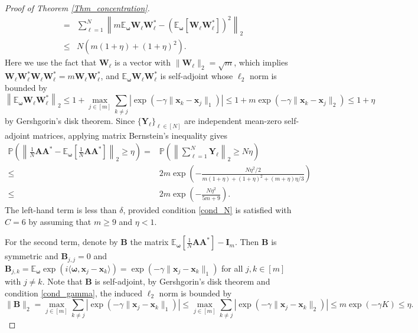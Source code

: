 \documentclass[11pt,twoside]{article}
\theoremstyle{plain}
\theoremstyle{definition}
\theoremstyle{remark}
\newcommand{\E}{\mathbb{E}}
\newcommand{\Pbb}{\mathbb{P}}
\newcommand{\Ab}{\mathbf{A}}
\newcommand{\Bb}{\mathbf{B}}
\newcommand{\Ib}{\mathbf{I}}
\newcommand{\Yb}{\mathbf{Y}}
\newcommand{\Wb}{\mathbf{W}}
\newcommand{\xb}{\mathbf{x}}
\newcommand{\omegab}{\boldsymbol\omega}
\begin{document}
\begin{proof}[Proof of Theorem \ref{Thm_concentration}]
\begin{equation}
\begin{aligned}
=& \sum_{\ell=1}^N \left\| m\E_{\omegab} \Wb_\ell \Wb_\ell^* - \left( \E_{\omegab} \left[\Wb_\ell \Wb_\ell^*\right]\right)^2 \right\|_2 \\
\leq& N\left(m(1+\eta)+(1+\eta)^2\right).
\end{aligned}
\end{equation}
Here we use the fact that $\Wb_\ell$ is a vector with $\|\Wb_\ell\|_2 = \sqrt{m}$, which implies $\Wb_\ell \Wb_\ell^* \Wb_\ell \Wb_\ell^* = m \Wb_\ell \Wb_\ell^*$, and $\E_{\omegab} \Wb_\ell \Wb_\ell^*$ is self-adjoint whose $\ell_2$ norm is bounded by
\begin{equation}
\left\| \E_{\omegab} \Wb_\ell \Wb_\ell^* \right\|_2 \leq 1 + \max_{j\in[m]} \sum_{k\neq j} |\exp(-\gamma \|\xb_k-\xb_j\|_1)| \leq 1 + m\exp(-\gamma \|\xb_k-\xb_j\|_2 ) \leq 1+\eta
\end{equation}
by Gershgorin’s disk theorem. Since $\{\Yb_\ell\}_{\ell\in[N]}$ are independent mean-zero self-adjoint matrices, applying matrix Bernstein's inequality gives 
\begin{equation}
\begin{aligned}
\Pbb \left( \left\| \frac{1}{N}\Ab\Ab^* - \E_{\omegab} \left[\frac{1}{N}\Ab\Ab^*\right] \right\|_2 \geq \eta  \right) =& \Pbb \left( \left\|\sum_{\ell=1}^N \Yb_\ell \right\|_2 \geq N\eta \right)\\ 
\leq & 2m\exp\left( - \frac{N\eta^2/2}{m(1+\eta)+(1+\eta)^2 + (m+\eta)\eta/3} \right) \\
\leq& 2m\exp\left( - \frac{N\eta^2}{5m+9} \right).
\end{aligned}
\end{equation}
The left-hand term is less than $\delta$, provided condition \eqref{cond_N} is satisfied with $C=6$ by assuming that $m\geq 9$ and $\eta<1$.

For the second term, denote by $\Bb$ the matrix $\E_{\omegab} [\frac{1}{N}\Ab\Ab^*] - \Ib_m$. Then $\Bb$ is symmetric and $\Bb_{j,j}=0$ and $\Bb_{j,k} = \E_{\omegab} \exp(i\langle \omegab, \xb_j-\xb_k\rangle) = \exp(-\gamma\|\xb_j-\xb_k\|_1)$ for all $j,k\in[m]$ with $j\neq k$. 
Note that $\Bb$ is self-adjoint, by Gershgorin's disk theorem and condition \eqref{cond_gamma}, the induced $\ell_2$ norm is bounded by 
\begin{equation*}
\|\Bb\|_2 = \max_{j\in[m]}\sum_{k\neq j} |\exp(-\gamma\|\xb_j-\xb_k\|_1)| \leq \max_{j\in[m]}\sum_{k\neq j}|\exp(-\gamma\|\xb_j-\xb_k\|_2)| \leq m\exp(-\gamma K) \leq \eta. 
\end{equation*}
\end{proof}
\end{document}
